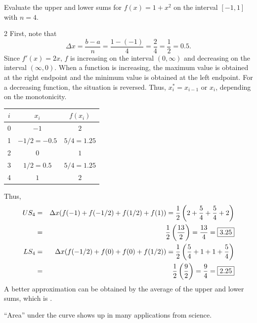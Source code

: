 \documentclass{book}
\begin{document}
\begin{Exam} Evaluate the upper and lower sums for $f(x) =1+x^2$ on the interval $[-1,1]$ with $n=4$.
\begin{multicols}{2}
First, note that \[\Delta x = \dfrac{b-a}{n} = \dfrac{1-(-1)}{4} = \dfrac{2}{4} = \dfrac{1}{2} = 0.5.\]  Since $f'(x) = 2x$, $f$ is increasing on the interval $(0,\infty)$ and decreasing on the interval $(\infty,0)$. When a function is increasing, the maximum value is obtained at the right endpoint and the minimum value is obtained at the left endpoint. For a decreasing function, the situation is reversed. Thus, $x_i^* = x_{i-1}$ or $x_i$, depending on the monotonicity.

\begin{center}
\begin{tabular}{c|c|c}
$i$ & $x_i$ & $f(x_i)$ \\ \hline\hline
0 & $-1$ & $2$ \\ \hline
1 & $-1/2 = -0.5$ & $5/4 = 1.25$ \\ \hline
2 & $0 $ & $1$ \\ \hline
3 & $1/2 = 0.5$ & $5/4 = 1.25$ \\ \hline
4 & $1$ & $2$ \\ 
\end{tabular}
\end{center}
\end{multicols}
Thus,
\begin{eqnarray*}
US_4 &=& \Delta x(f(-1) + f(-1/2) + f(1/2) + f(1)) = \dfrac{1}{2}\left(2 + \dfrac{5}{4} + \dfrac{5}{4} + 2\right)\\ &=& \dfrac{1}{2}\left(\dfrac{13}{2}\right) = \dfrac{13}{4} = \fbox{$3.25$}\\
LS_4 &=& \Delta x(f(-1/2) + f(0) + f(0) + f(1/2)) = \dfrac{1}{2}\left(\dfrac{5}{4} + 1 + 1+ \dfrac{5}{4}\right)\\ &=& \dfrac{1}{2}\left(\dfrac{9}{2}\right) = \dfrac{9}{4} = \fbox{$2.25$}
\end{eqnarray*} A better approximation can be obtained by the average of the upper and lower sums, which is .
\end{Exam}\vs

``Area'' under the curve shows up in many applications from science.
\end{document}
